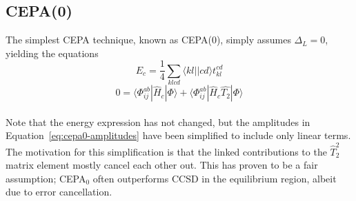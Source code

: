 \documentclass{article}[11pt]
\begin{document}
\subsection*{CEPA(0)}
The simplest CEPA technique, known as CEPA(0), simply assumes $\Delta_{{L}} = 0$, yielding the equations
\begin{equation}
    E_c
= 
    \frac{1}{4}
   \sum\limits_{klcd}
   \langle kl || cd \rangle
   t_{kl}^{cd}
\end{equation}
\begin{equation}
	\label{eq:cepa0-amplitudes}
    0 
= 
   \langle \Phi_{ij}^{ab} | 
      \hat{H}_c 
   | \Phi \rangle
+
   \langle \Phi_{ij}^{ab} |
      \hat{H}_c
      \hat{T_2}
   | \Phi \rangle
\end{equation}
\\
Note that the energy expression has not changed, but the amplitudes in
Equation~\ref{eq:cepa0-amplitudes} have been simplified to include only linear
terms.
The motivation for this simplification is that the linked contributions to the
$\hat{T}_2^2$ matrix element mostly cancel each other out. 
This has proven to be a fair assumption; CEPA$_0$ often outperforms CCSD in the
equilibrium region, albeit due to error cancellation.
\end{document}
